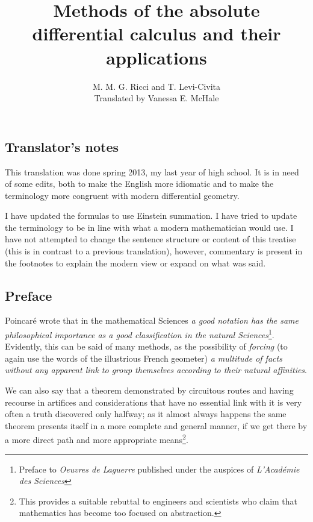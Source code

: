 \documentclass{book}
\begin{document}
\title{Methods of the absolute differential calculus and their applications}
\author{M. M. G. Ricci and T. Levi-Civita\\
Translated by Vanessa E. McHale}
\date{}
\maketitle
\tableofcontents

\subsection*{Translator's notes}
This translation was done spring 2013, my last year of high school. It is in need of some edits, both to make the English more idiomatic and to make the terminology more congruent with modern differential geometry. 

I have updated the formulas to use Einstein summation. I have tried to update the terminology to be in line with what a modern mathematician would use. I have not attempted to change the sentence structure or content of this treatise (this is in contrast to a previous translation), however, commentary is present in the footnotes to explain the modern view or expand on what was said.
\subsection*{Preface}
Poincar\'{e} wrote that in the mathematical Sciences \emph{a good notation has the same philosophical importance as a good classification in the natural Sciences}\footnote{Preface to \emph{Oeuvres de Laguerre} published under the auspices of \emph{L'Acad\'{e}mie des Sciences}}. Evidently, this can be said of many methods, as the possibility of \emph{forcing} (to again use the words of the illustrious French geometer) \emph{a multitude of facts without any apparent link to group themselves according to their natural affinities}.

We can also say that a theorem demonstrated by circuitous routes and having recourse in artifices and considerations that have no essential link with it is very often a truth discovered only halfway; as it almost always happens the same theorem presents itself in a more complete and general manner, if we get there by a more direct path and more appropriate means\footnote{This provides a suitable rebuttal to engineers and scientists who claim that mathematics has become too focused on abstraction.}.
\end{document}
